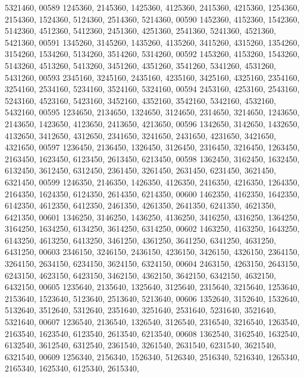 \begin{DoxyCode}
      5321460,
00589       1245360, 2145360, 1425360, 4125360, 2415360, 4215360, 1254360, 2154360, 1524360, 5124360, 2514360, 
      5214360,
00590       1452360, 4152360, 1542360, 5142360, 4512360, 5412360, 2451360, 4251360, 2541360, 5241360, 4521360, 
      5421360,
00591       1345260, 3145260, 1435260, 4135260, 3415260, 4315260, 1354260, 3154260, 1534260, 5134260, 3514260, 
      5314260,
00592       1453260, 4153260, 1543260, 5143260, 4513260, 5413260, 3451260, 4351260, 3541260, 5341260, 4531260, 
      5431260,
00593       2345160, 3245160, 2435160, 4235160, 3425160, 4325160, 2354160, 3254160, 2534160, 5234160, 3524160, 
      5324160,
00594       2453160, 4253160, 2543160, 5243160, 4523160, 5423160, 3452160, 4352160, 3542160, 5342160, 4532160, 
      5432160,
00595       1234650, 2134650, 1324650, 3124650, 2314650, 3214650, 1243650, 2143650, 1423650, 4123650, 2413650, 
      4213650,
00596       1342650, 3142650, 1432650, 4132650, 3412650, 4312650, 2341650, 3241650, 2431650, 4231650, 3421650, 
      4321650,
00597       1236450, 2136450, 1326450, 3126450, 2316450, 3216450, 1263450, 2163450, 1623450, 6123450, 2613450, 
      6213450,
00598       1362450, 3162450, 1632450, 6132450, 3612450, 6312450, 2361450, 3261450, 2631450, 6231450, 3621450, 
      6321450,
00599       1246350, 2146350, 1426350, 4126350, 2416350, 4216350, 1264350, 2164350, 1624350, 6124350, 2614350, 
      6214350,
00600       1462350, 4162350, 1642350, 6142350, 4612350, 6412350, 2461350, 4261350, 2641350, 6241350, 4621350, 
      6421350,
00601       1346250, 3146250, 1436250, 4136250, 3416250, 4316250, 1364250, 3164250, 1634250, 6134250, 3614250, 
      6314250,
00602       1463250, 4163250, 1643250, 6143250, 4613250, 6413250, 3461250, 4361250, 3641250, 6341250, 4631250, 
      6431250,
00603       2346150, 3246150, 2436150, 4236150, 3426150, 4326150, 2364150, 3264150, 2634150, 6234150, 3624150, 
      6324150,
00604       2463150, 4263150, 2643150, 6243150, 4623150, 6423150, 3462150, 4362150, 3642150, 6342150, 4632150, 
      6432150,
00605       1235640, 2135640, 1325640, 3125640, 2315640, 3215640, 1253640, 2153640, 1523640, 5123640, 2513640, 
      5213640,
00606       1352640, 3152640, 1532640, 5132640, 3512640, 5312640, 2351640, 3251640, 2531640, 5231640, 3521640, 
      5321640,
00607       1236540, 2136540, 1326540, 3126540, 2316540, 3216540, 1263540, 2163540, 1623540, 6123540, 2613540, 
      6213540,
00608       1362540, 3162540, 1632540, 6132540, 3612540, 6312540, 2361540, 3261540, 2631540, 6231540, 3621540, 
      6321540,
00609       1256340, 2156340, 1526340, 5126340, 2516340, 5216340, 1265340, 2165340, 1625340, 6125340, 2615340, 

\end{DoxyCode}
